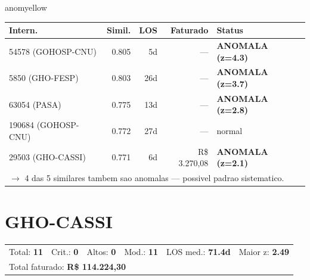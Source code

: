 \documentclass[a4paper,10pt]{article}
\begin{document}
\begin{anomalycard}[Internacao 118702 | GHO-BRADESCO | MODERADO (z=2.07)]{anomyellow}
\begin{tabular}{l r r r l}\toprule\textbf{Intern.} & \textbf{Simil.} & \textbf{LOS} & \textbf{Faturado} & \textbf{Status} \\\midrule
54578 (GOHOSP-CNU) & 0.805 & 5d & --- & \textcolor{anomred}{\textbf{ANOMALA (z=4.3)}} \\
5850 (GHO-FESP) & 0.803 & 26d & --- & \textcolor{anomred}{\textbf{ANOMALA (z=3.7)}} \\
63054 (PASA) & 0.775 & 13d & --- & \textcolor{anomred}{\textbf{ANOMALA (z=2.8)}} \\
190684 (GOHOSP-CNU) & 0.772 & 27d & --- & \textcolor{jcubeblue}{normal} \\
29503 (GHO-CASSI) & 0.771 & 6d & R\$ 3.270,08 & \textcolor{anomred}{\textbf{ANOMALA (z=2.1)}} \\
\multicolumn{5}{l}{\textcolor{anomred}{\small $\rightarrow$ 4 das 5 similares tambem sao anomalas --- possivel padrao sistematico.}} \\
\bottomrule\end{tabular}


\end{anomalycard}

\newpage

\clearpage
\section{GHO-CASSI}
\begin{tcolorbox}[colback=lightblue,colframe=jcubeblue,title={\textbf{Resumo --- GHO-CASSI}}]
\begin{tabular}{ll@{\quad}ll@{\quad}ll}
Total: \textbf{11} &
Crit.: \textcolor{anomred}{\textbf{0}} &
Altos: \textcolor{anomorange}{\textbf{0}} &
Mod.: \textcolor{anomyellow}{\textbf{11}} &
LOS med.: \textbf{71.4d} &
Maior z: \textbf{2.49} \\

\multicolumn{6}{l}{Total faturado: \textbf{R\$ 114.224,30}} \\

\end{tabular}
\end{tcolorbox}
\end{document}

